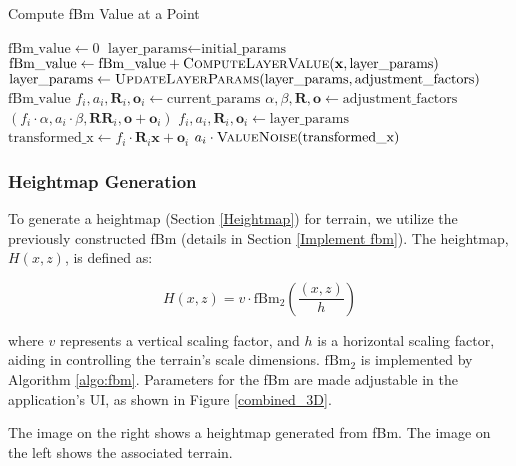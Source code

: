 \begin{algorithm}
\caption{Compute fBm Value at a Point}
\label{algo:fbm}
\begin{algorithmic}[1]
    \State $\text{fBm\_value} \gets 0$
    \State $\text{layer\_params} \gets \text{initial\_params}$
        \State $\text{fBm\_value} \gets \text{fBm\_value} + \Call{ComputeLayerValue}{\mathbf{x}, \text{layer\_params}}$
        \State $\text{layer\_params} \gets \Call{UpdateLayerParams}{\text{layer\_params}, \text{adjustment\_factors}}$
    \EndFor
    \State \Return $\text{fBm\_value}$
\EndFunction
\Statex
{}
    \State $f_i, a_i, \mathbf{R}_i, \mathbf{o}_i \gets \text{current\_params}$
    \State $\alpha, \beta, \mathbf{R}, \mathbf{o} \gets \text{adjustment\_factors}$
    \State \Return $(f_i \cdot \alpha, a_i \cdot \beta, \mathbf{R} \mathbf{R}_i, \mathbf{o} + \mathbf{o}_i)$
\EndFunction
\Statex
{}
    \State $f_i, a_i, \mathbf{R}_i, \mathbf{o}_i \gets \text{layer\_params}$
    \State $\text{transformed\_x} \gets f_i \cdot \mathbf{R}_i \textbf{x} + \mathbf{o}_i$
    \State \Return $a_i \cdot \Call{ValueNoise}{\text{transformed\_x}}$
\EndFunction
\end{algorithmic}
\end{algorithm}

\subsubsection{Heightmap Generation}

To generate a heightmap (Section \ref{Heightmap}) for terrain, we utilize the previously constructed fBm (details in Section \ref{Implement fbm}). The heightmap, $H(x,z)$, is defined as:

\begin{equation}
    H(x,z) = v\cdot\text{fBm}_{2}(\frac{(x,z)}{h})
\end{equation}

where $v$ represents a vertical scaling factor, and $h$ is a horizontal scaling factor, aiding in controlling the terrain's scale dimensions. $\text{fBm}_{2}$ is implemented by Algorithm \ref{algo:fbm}. Parameters for the fBm are made adjustable in the application's UI, as shown in Figure \ref{combined_3D}.

{The image on the right shows a heightmap generated from fBm. The image on the left shows the associated terrain.}

